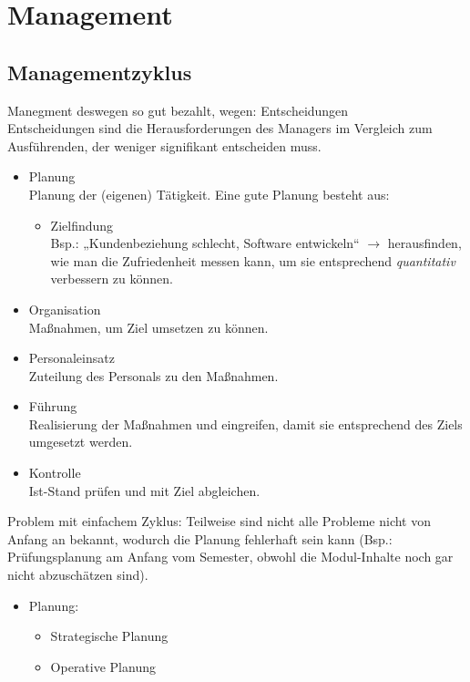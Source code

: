 \documentclass{scrreprt}
\begin{document}
\chapter{Management}
\section{Managementzyklus}
Manegment deswegen so gut bezahlt, wegen: Entscheidungen\\
Entscheidungen sind die Herausforderungen des Managers im Vergleich zum Ausführenden, der weniger signifikant entscheiden muss.
\begin{itemize}
\item Planung\\
Planung der (eigenen) Tätigkeit. Eine gute Planung besteht aus:
\begin{itemize}
\item Zielfindung\\
Bsp.: „Kundenbeziehung schlecht, Software entwickeln“ $\rightarrow$ herausfinden, wie man die Zufriedenheit messen kann, um sie entsprechend \emph{quantitativ} verbessern zu können.
\end{itemize}
\item Organisation\\
Maßnahmen, um Ziel umsetzen zu können.
\item Personaleinsatz\\
Zuteilung des Personals zu den Maßnahmen.
\item Führung\\
Realisierung der Maßnahmen und eingreifen, damit sie entsprechend des Ziels umgesetzt werden.
\item Kontrolle\\
Ist-Stand prüfen und mit Ziel abgleichen.
\end{itemize}
Problem mit einfachem Zyklus: Teilweise sind nicht alle Probleme nicht von Anfang an bekannt, wodurch die Planung fehlerhaft sein kann (Bsp.: Prüfungsplanung am Anfang vom Semester, obwohl die Modul-Inhalte noch gar nicht abzuschätzen sind).
\begin{itemize}
\item Planung:
\begin{itemize}
\item Strategische Planung
\item Operative Planung
\end{itemize}
\end{itemize}
\end{document}
